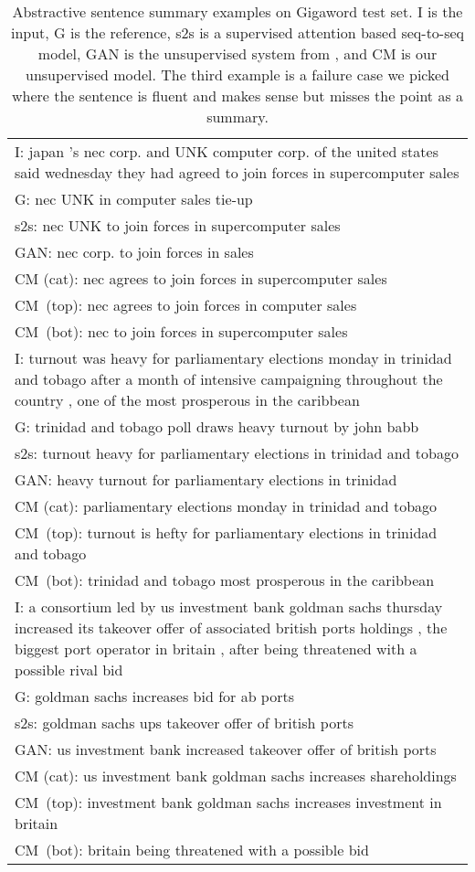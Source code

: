 \documentclass[11pt,a4paper]{article}
\begin{document}
\begin{table}[t!]
\small
\begin{center}
\begin{tabular}{p{}}
\toprule
I: japan 's nec corp. and UNK computer corp. of the united states said wednesday they had agreed to join forces in supercomputer sales\\
G: nec UNK in computer sales tie-up \\
s2s: nec UNK to join forces in supercomputer sales \\
GAN: nec corp. to join forces in sales \\
CM (cat): nec agrees to join forces in supercomputer sales\\
CM\ (top): nec agrees to join forces in computer sales\\
CM\ (bot): nec to join forces in supercomputer sales\\
\midrule
I: turnout was heavy for parliamentary elections monday in trinidad and tobago after a month of intensive campaigning throughout the country , one of the most prosperous in the caribbean\\
G: trinidad and tobago poll draws heavy turnout by john babb\\
s2s: turnout heavy for parliamentary elections in trinidad and tobago\\
GAN: heavy turnout for parliamentary elections in trinidad\\
CM (cat): parliamentary elections monday in trinidad and tobago\\
CM\ (top): turnout is hefty for parliamentary elections in trinidad and tobago\\
CM\ (bot): trinidad and tobago most prosperous in the caribbean\\
\midrule
I: a consortium led by us investment bank goldman sachs thursday increased its takeover offer of associated british ports holdings , the biggest port operator in britain , after being threatened with a possible rival bid\\
G: goldman sachs increases bid for ab ports\\
s2s: goldman sachs ups takeover offer of british ports\\
GAN: us investment bank increased takeover offer of british ports\\
CM (cat): us investment bank goldman sachs increases shareholdings\\
CM\ (top): investment bank goldman sachs increases investment in britain\\
CM\ (bot): britain being threatened with a possible bid\\
\bottomrule
\end{tabular}
\end{center}
\caption{Abstractive sentence summary examples on Gigaword test set. I is the input, G is the reference, s2s is a supervised attention based seq-to-seq model, GAN is the unsupervised system from \citet{wang2018learning}, and CM is our unsupervised model. The third example is a failure case we picked where the sentence is fluent and makes sense but misses the point as a summary.}
\label{table:examples}
\end{table}
\end{document}

